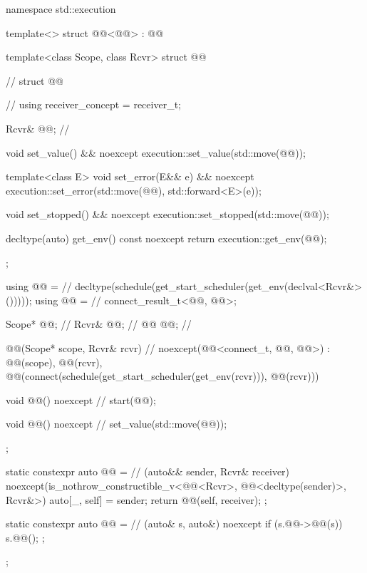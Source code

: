%
\begin{codeblock}
namespace std::execution {
  template<>
  struct @@<@@> : @@ {
    template<class Scope, class Rcvr>
    struct @@ {                          // \expos
      struct @@ {                       // \expos
        using receiver_concept = receiver_t;

        Rcvr& @@;                         // \expos

        void set_value() && noexcept {
          execution::set_value(std::move(@@));
        }

        template<class E>
          void set_error(E&& e) && noexcept {
            execution::set_error(std::move(@@), std::forward<E>(e));
          }

        void set_stopped() && noexcept {
          execution::set_stopped(std::move(@@));
        }

        decltype(auto) get_env() const noexcept {
          return execution::get_env(@@);
        }
      };

      using @@ =                  // \expos
        decltype(schedule(get_start_scheduler(get_env(declval<Rcvr&>()))));
      using @@ =                          // \expos
        connect_result_t<@@, @@>;

      Scope* @@;                         // \expos
      Rcvr& @@;                       // \expos
      @@ @@;                              // \expos

      @@(Scope* scope, Rcvr& rcvr)       // \expos
        noexcept(@@<connect_t, @@, @@>)
        : @@(scope),
          @@(rcvr),
          @@(connect(schedule(get_start_scheduler(get_env(rcvr))), @@(rcvr))) {}

      void @@() noexcept {            // \expos
        start(@@);
      }

      void @@() noexcept {     // \expos
        set_value(std::move(@@));
      }
    };

    static constexpr auto @@ =       // (auto&& sender, Rcvr& receiver)
        noexcept(is_nothrow_constructible_v<@@<Rcvr>, @@<decltype(sender)>, Rcvr&>) {
        auto[_, self] = sender;
        return @@(self, receiver);
      };

    static constexpr auto @@ =           // \expos
      [](auto& s, auto&) noexcept {
        if (s.@@->@@(s))
          s.@@();
      };
  };
}
\end{codeblock}

